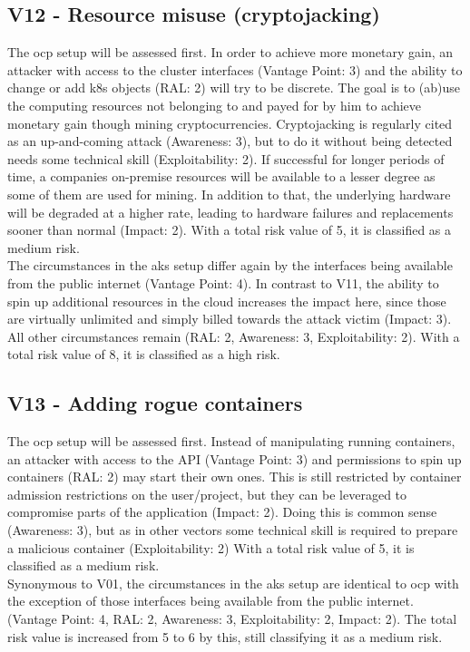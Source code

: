 \newpage
\subsection{V12 - Resource misuse (cryptojacking)}

The \gls{ocp} setup will be assessed first.
In order to achieve more monetary gain, an attacker with access to the cluster interfaces (Vantage Point: 3) and the ability to change or add \gls{k8s} objects (RAL: 2) will try to be discrete. 
The goal is to (ab)use the computing resources not belonging to and payed for by him to achieve monetary gain though mining cryptocurrencies.
Cryptojacking is regularly cited as an up-and-coming attack (Awareness: 3), but to do it without being detected needs some technical skill (Exploitability: 2).
If successful for longer periods of time, a companies on-premise resources will be available to a lesser degree as some of them are used for mining. In addition to that, the underlying hardware will be degraded at a higher rate, leading to hardware failures and replacements sooner than normal (Impact: 2).
With a total risk value of 5, it is classified as a medium risk. \\
The circumstances in the \gls{aks} setup differ again by the interfaces being available from the public internet (Vantage Point: 4).
In contrast to V11, the ability to spin up additional resources in the cloud increases the impact here, since those are virtually unlimited and simply billed towards the attack victim (Impact: 3).
All other circumstances remain (RAL: 2, Awareness: 3, Exploitability: 2).
With a total risk value of 8, it is classified as a high risk.

\subsection{V13 - Adding rogue containers}

The \gls{ocp} setup will be assessed first.
Instead of manipulating running containers, an attacker with access to the API (Vantage Point: 3) and permissions to spin up containers (RAL: 2) may start their own ones. 
This is still restricted by container admission restrictions on the user/project, but they can be leveraged to compromise parts of the application (Impact: 2).
Doing this is common sense (Awareness: 3), but as in other vectors some technical skill is required to prepare a malicious container (Exploitability: 2)
With a total risk value of 5, it is classified as a medium risk. \\
Synonymous to V01, the circumstances in the \gls{aks} setup are identical to \gls{ocp} with the exception of those interfaces being available from the public internet. (Vantage Point: 4, RAL: 2, Awareness: 3, Exploitability: 2, Impact: 2). 
The total risk value is increased from 5 to 6 by this, still classifying it as a medium risk.

